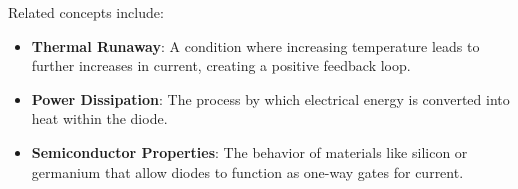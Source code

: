 Related concepts include:
\begin{itemize}
    \item \textbf{Thermal Runaway}: A condition where increasing temperature leads to further increases in current, creating a positive feedback loop.
    \item \textbf{Power Dissipation}: The process by which electrical energy is converted into heat within the diode.
    \item \textbf{Semiconductor Properties}: The behavior of materials like silicon or germanium that allow diodes to function as one-way gates for current.
\end{itemize}

